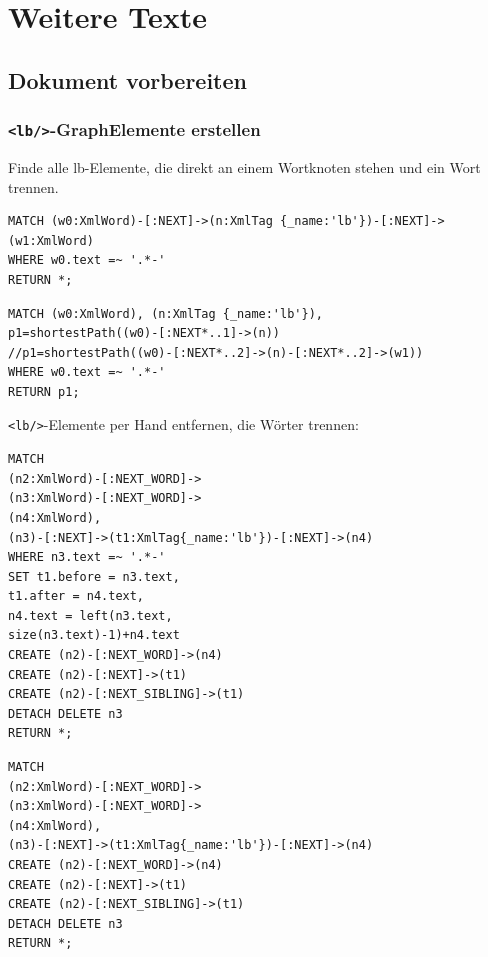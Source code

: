\documentclass[ngerman,]{scrreprt}
\begin{document}
\section{Weitere Texte}\label{weitere-texte}

\subsection{Dokument vorbereiten}\label{dokument-vorbereiten}

\subsubsection{\texorpdfstring{\texttt{\textless{}lb/\textgreater{}}-GraphElemente erstellen}{\textless{}lb/\textgreater{}-GraphElemente erstellen}}\label{lb-graphelemente-erstellen}

Finde alle lb-Elemente, die direkt an einem Wortknoten stehen und ein Wort trennen.

\begin{verbatim}
MATCH (w0:XmlWord)-[:NEXT]->(n:XmlTag {_name:'lb'})-[:NEXT]->(w1:XmlWord)
WHERE w0.text =~ '.*-'
RETURN *;
\end{verbatim}

\begin{verbatim}
MATCH (w0:XmlWord), (n:XmlTag {_name:'lb'}),
p1=shortestPath((w0)-[:NEXT*..1]->(n))
//p1=shortestPath((w0)-[:NEXT*..2]->(n)-[:NEXT*..2]->(w1))
WHERE w0.text =~ '.*-'
RETURN p1;
\end{verbatim}

\texttt{\textless{}lb/\textgreater{}}-Elemente per Hand entfernen, die Wörter trennen:

\begin{verbatim}
MATCH
(n2:XmlWord)-[:NEXT_WORD]->
(n3:XmlWord)-[:NEXT_WORD]->
(n4:XmlWord),
(n3)-[:NEXT]->(t1:XmlTag{_name:'lb'})-[:NEXT]->(n4)
WHERE n3.text =~ '.*-'
SET t1.before = n3.text,
t1.after = n4.text,
n4.text = left(n3.text,
size(n3.text)-1)+n4.text
CREATE (n2)-[:NEXT_WORD]->(n4)
CREATE (n2)-[:NEXT]->(t1)
CREATE (n2)-[:NEXT_SIBLING]->(t1)
DETACH DELETE n3
RETURN *;
\end{verbatim}

\begin{verbatim}
MATCH
(n2:XmlWord)-[:NEXT_WORD]->
(n3:XmlWord)-[:NEXT_WORD]->
(n4:XmlWord),
(n3)-[:NEXT]->(t1:XmlTag{_name:'lb'})-[:NEXT]->(n4)
CREATE (n2)-[:NEXT_WORD]->(n4)
CREATE (n2)-[:NEXT]->(t1)
CREATE (n2)-[:NEXT_SIBLING]->(t1)
DETACH DELETE n3
RETURN *;
\end{verbatim}
\end{document}
